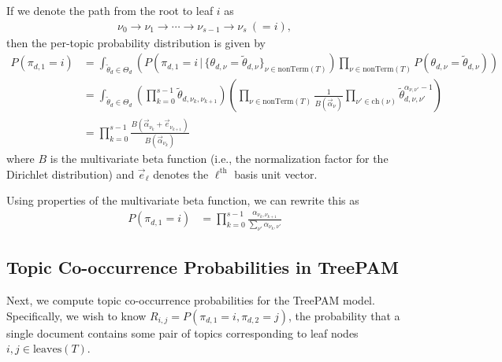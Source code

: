 \documentclass{article}
\theoremstyle{definition}
\newcommand{\nth}{^{\text{th}}}
\newcommand{\leaves}{\text{leaves}}
\newcommand{\nonTerm}{\text{nonTerm}}
\begin{document}
If we denote the path from the root to leaf $i$ as
\begin{align*}
\nu_0 \to \nu_1 \to \cdots \to \nu_{s-1} \to \nu_s \ (=i),
\end{align*}
then the per-topic probability distribution is given by
\begin{align*}
P(\pi_{d,1} = i)
&=
\int_{\tilde \theta_d \in \Theta_d}
  \left(
  P\left(\pi_{d,1}=i \,|\, \{ \theta_{d,\nu} = \tilde \theta_{d,\nu} \}_{\nu \in \nonTerm(T)}\right)
  \prod_{\nu \in \nonTerm(T)} P\left(\theta_{d,\nu} = \tilde \theta_{d,\nu}\right)
  \right)
\\
&=
\int_{\tilde \theta_d \in \Theta_d}
  \left(
  \prod_{k=0}^{s-1} \tilde \theta_{d,\nu_k,\nu_{k+1}}
  \right)
  \left(
  \prod_{\nu \in \nonTerm(T)}
  \frac{1}{B(\vec\alpha_\nu)}
  \prod_{\nu' \in \text{ch}(\nu)}
  \tilde \theta_{d,\nu,\nu'}^{\alpha_{\nu,\nu'}-1}
  \right)
\\
&=
\prod_{k=0}^{s-1}
  \frac{B(\vec\alpha_{\nu_k} + \vec e_{\nu_{k+1}})}
       {B(\vec\alpha_{\nu_k})}
\end{align*}
where $B$ is the multivariate beta function (i.e., the normalization factor for the Dirichlet distribution) and $\vec e_\ell$ denotes the $\ell\nth$ basis unit vector.

Using properties of the multivariate beta function, we can rewrite this as
\begin{align*}
P(\pi_{d,1} = i)
&=
\prod_{k=0}^{s-1}
  \frac{\alpha_{\nu_k,\nu_{k+1}}}
       {\sum_{\nu'} \alpha_{\nu_k,\nu'}}
\end{align*}

\subsection{Topic Co-occurrence Probabilities in TreePAM}

Next, we compute topic co-occurrence probabilities for the TreePAM model.
Specifically, we wish to know $R_{i,j} = P(\pi_{d,1} = i, \pi_{d,2} = j)$, the probability that a single document contains some pair of topics corresponding to leaf nodes $i, j \in \leaves(T)$.
\end{document}

